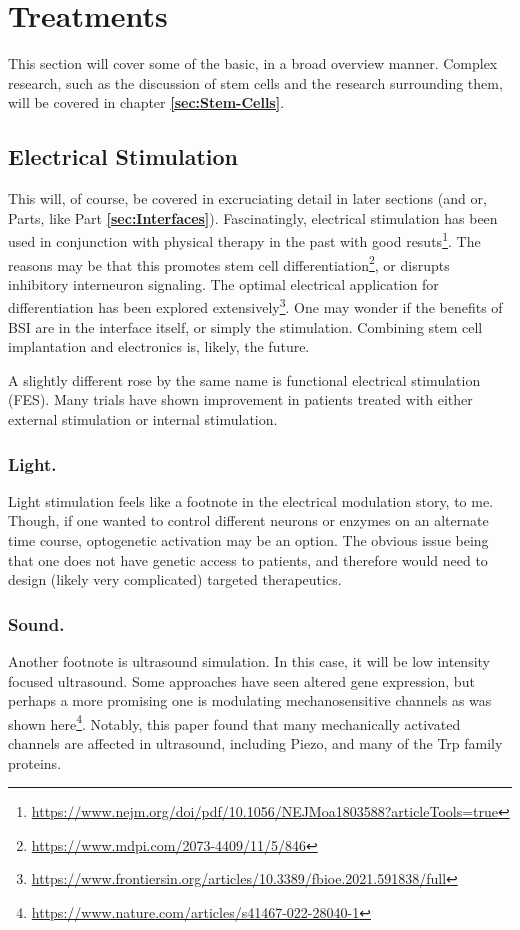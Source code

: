 \section{Treatments}

This section will cover some of the basic, in a broad overview manner. Complex research, such as the discussion of stem cells and the research surrounding them, will be covered in chapter \textbf{\ref{sec:Stem-Cells}}. \newline

\subsection{Electrical Stimulation}

This will, of course, be covered in excruciating detail in later sections (and or, Parts, like Part \textbf{\ref{sec:Interfaces}}). Fascinatingly, electrical stimulation has been used in conjunction with physical therapy in the past with good resuts\footnote{\url{https://www.nejm.org/doi/pdf/10.1056/NEJMoa1803588?articleTools=true}}. The reasons may be that this promotes stem cell differentiation\footnote{\url{https://www.mdpi.com/2073-4409/11/5/846}}, or disrupts inhibitory interneuron signaling. The optimal electrical application for differentiation has been explored extensively\footnote{\url{https://www.frontiersin.org/articles/10.3389/fbioe.2021.591838/full}}. One may wonder if the benefits of BSI are in the interface itself, or simply the stimulation. Combining stem cell implantation and electronics is, likely, the future.\newline

A slightly different rose by the same name is functional electrical stimulation (FES). Many trials have shown improvement in patients treated with either external stimulation or internal stimulation. 

\subsubsection{Light.}
Light stimulation feels like a footnote in the electrical modulation story, to me. Though, if one wanted to control different neurons or enzymes on an alternate time course, optogenetic activation may be an option. The obvious issue being that one does not have genetic access to patients, and therefore would need to design (likely very complicated) targeted therapeutics. 

\subsubsection{Sound.}
Another footnote is ultrasound simulation. In this case, it will be low intensity focused ultrasound. Some approaches have seen altered gene expression, but perhaps a more promising one is modulating mechanosensitive channels as was shown here\footnote{\url{https://www.nature.com/articles/s41467-022-28040-1}}. Notably, this paper found that many mechanically activated channels are affected in ultrasound, including Piezo, and many of the Trp family proteins. 

